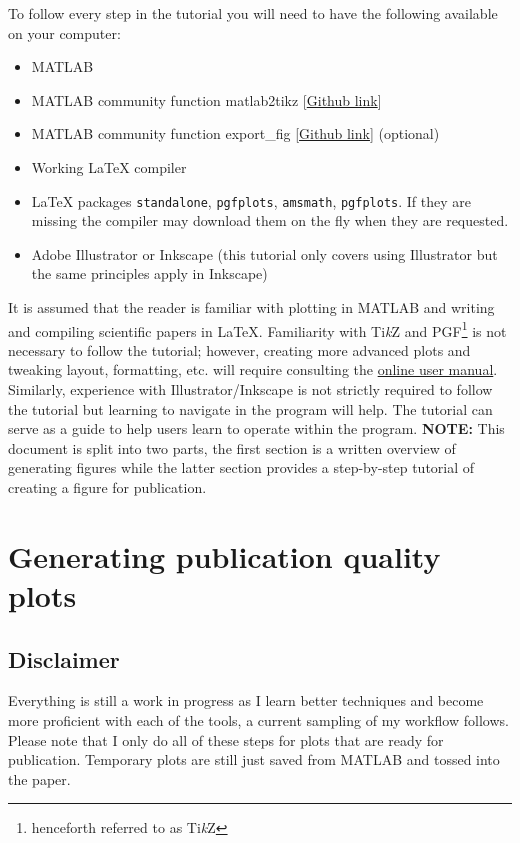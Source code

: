 \documentclass[journal,10pt]{IEEEtran}
\newcommand{\tikz}{\textup{Ti\textit{k}Z}\xspace}
\begin{document}
To follow every step in the tutorial you will need to have the following available on your computer:
\begin{itemize}
	\item MATLAB
	\item MATLAB community function matlab2tikz [\href{https://github.com/matlab2tikz/matlab2tikz}{Github link}]
	\item MATLAB community function export\_fig [\href{https://github.com/altmany/export_fig}{Github link}] (optional)
	\item Working \LaTeX{} compiler
	\item \LaTeX{} packages \texttt{standalone}, \texttt{pgfplots}, \texttt{amsmath}, \texttt{pgfplots}. If they are missing the compiler may download them on the fly when they are requested.
	\item Adobe Illustrator or Inkscape (this tutorial only covers using Illustrator but the same principles apply in Inkscape)
\end{itemize}
It is assumed that the reader is familiar with plotting in MATLAB and writing and compiling scientific papers in \LaTeX{}.
Familiarity with \tikz and PGF\footnote{henceforth referred to as \tikz} is not necessary to follow the tutorial; however, creating more advanced plots and tweaking layout, formatting, etc. will require consulting the \href{http://mirrors.rit.edu/CTAN/graphics/pgf/base/doc/pgfmanual.pdf}{online user manual}.
Similarly, experience with Illustrator/Inkscape is not strictly required to follow the tutorial but learning to navigate in the program will help.
The tutorial can serve as a guide to help users learn to operate within the program.
\newline
\newline
\noindent\textbf{NOTE:} This document is split into two parts, the first section is a written overview of generating figures while the latter section provides a step-by-step tutorial of creating a figure for publication.

\section{Generating publication quality plots}
\subsection{Disclaimer}
Everything is still a work in progress as I learn better techniques and become more proficient with each of the tools, a current sampling of my workflow follows.
Please note that I only do all of these steps for plots that are ready for publication.
Temporary plots are still just saved from MATLAB and tossed into the paper.
\end{document}

